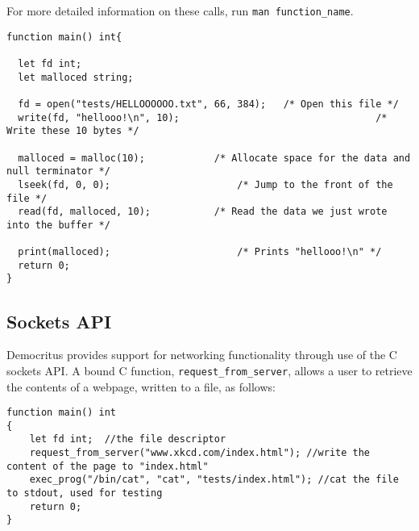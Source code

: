 		\noindent
		For more detailed information on these calls, run \texttt{man function\_name}.

		\begin{lstlisting}
function main() int{

  let fd int;
  let malloced string;
  
  fd = open("tests/HELLOOOOOO.txt", 66, 384); 	/* Open this file */
  write(fd, "hellooo!\n", 10); 									/* Write these 10 bytes */
  
  malloced = malloc(10); 			/* Allocate space for the data and null terminator */
  lseek(fd, 0, 0);						/* Jump to the front of the file */
  read(fd, malloced, 10);			/* Read the data we just wrote into the buffer */
  
  print(malloced);						/* Prints "hellooo!\n" */
  return 0;
}
		\end{lstlisting}

	\subsection{Sockets API}
	Democritus provides support for networking functionality through use of the C sockets API. A bound C function, \texttt{request\_from\_server}, allows a user to retrieve the contents of a webpage, written to a file, as follows:
	
			\begin{lstlisting}
function main() int
{
    let fd int;  //the file descriptor
    request_from_server("www.xkcd.com/index.html"); //write the content of the page to "index.html"
    exec_prog("/bin/cat", "cat", "tests/index.html"); //cat the file to stdout, used for testing 
    return 0;
}
		\end{lstlisting}
